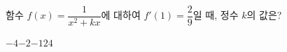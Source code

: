 함수 $f(x)=\dfrac{1}{x^2+kx}$에 대하여 $f'(1)=\dfrac{2}{9}$일 때, 정수 $k$의 값은?
\begin{choices32}{$-4$}{$-2$}{$-1$}{$2$}{$4$}\end{choices32}
